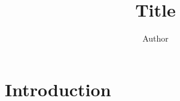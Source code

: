 \documentclass[11pt]{article}
\title{Title}
\author{Author}
\begin{document}
\maketitle
\begin{abstract}
\end{abstract}
\section{Introduction}\label{sec:intro}


\end{document}
